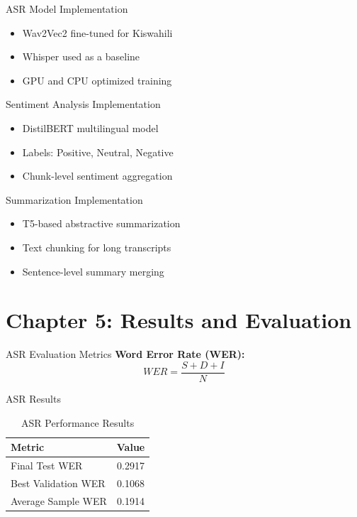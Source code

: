 \documentclass{beamer}
\begin{document}
\begin{frame}{ASR Model Implementation}
\begin{itemize}
    \item Wav2Vec2 fine-tuned for Kiswahili
    \item Whisper used as a baseline
    \item GPU and CPU optimized training
\end{itemize}
\end{frame}

\begin{frame}{Sentiment Analysis Implementation}
\begin{itemize}
    \item DistilBERT multilingual model
    \item Labels: Positive, Neutral, Negative
    \item Chunk-level sentiment aggregation
\end{itemize}
\end{frame}

\begin{frame}{Summarization Implementation}
\begin{itemize}
    \item T5-based abstractive summarization
    \item Text chunking for long transcripts
    \item Sentence-level summary merging
\end{itemize}
\end{frame}

\section{Chapter 5: Results and Evaluation}

\begin{frame}{ASR Evaluation Metrics}
\textbf{Word Error Rate (WER):}
\[
WER = \frac{S + D + I}{N}
\]
\end{frame}

\begin{frame}{ASR Results}
\begin{table}
\centering
\begin{tabular}{lc}
\toprule
Metric & Value \\
\midrule
Final Test WER & 0.2917 \\
Best Validation WER & 0.1068 \\
Average Sample WER & 0.1914 \\
\bottomrule
\end{tabular}
\caption{ASR Performance Results}
\end{table}
\end{frame}
\end{document}
